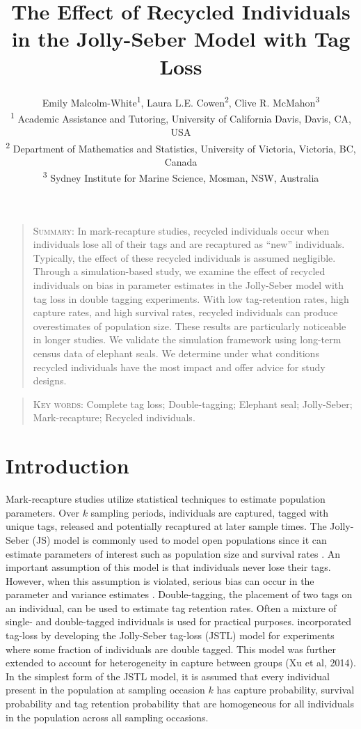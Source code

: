 \documentclass[]{article}
\title{The Effect of Recycled Individuals in the Jolly-Seber Model with Tag
Loss}
\author{Emily Malcolm-White\textsuperscript{1},
        Laura L.E. Cowen\textsuperscript{2}, 
        Clive R. McMahon\textsuperscript{3}\\ 
        \textsuperscript{1} Academic Assistance and Tutoring, University of California Davis, Davis, CA, USA\\ 
        \textsuperscript{2} Department of Mathematics and Statistics, University of Victoria, Victoria, BC, Canada\\
        \textsuperscript{3} Sydney Institute for Marine Science, Mosman, NSW, Australia}
\begin{document}
\maketitle


\begin{quote}
\textsc{Summary:} In mark-recapture studies, recycled individuals occur
when individuals lose all of their tags and are recaptured as ``new''
individuals. Typically, the effect of these recycled individuals is
assumed negligible. Through a simulation-based study, we examine the
effect of recycled individuals on bias in parameter estimates in the
Jolly-Seber model with tag loss \citep{Cowen:2006} in double tagging experiments. With low tag-retention
rates, high capture rates, and high survival rates, recycled individuals
can produce overestimates of population size. These results are
particularly noticeable in longer studies. We validate the simulation
framework using long-term census data of elephant seals. We
determine under what conditions recycled individuals have the most
impact and offer advice for study designs.
\end{quote}

\begin{quote}
\begin{center} \textsc{Key words:} Complete tag loss; Double-tagging; Elephant seal; Jolly-Seber; Mark-recapture;   Recycled individuals. 
\end{center}
\end{quote}

\section{Introduction}\label{introduction}

Mark-recapture studies utilize statistical techniques to estimate
population parameters. Over \(k\) sampling
periods, individuals are captured, tagged with unique tags, released and potentially
recaptured at later sample times. The Jolly-Seber (JS) model \citep{Jolly:1965, Seber:1965}
 is commonly used to model open populations since it
can estimate parameters of interest such as population size and survival
rates \citep{Pollock:1990}. An important assumption of this model is that 
individuals never lose their tags. However, when this assumption is
violated, serious bias can occur in the parameter and variance estimates
\citep{Arnason:1981}. Double-tagging, the placement of two tags on
an individual, can be used to estimate tag retention rates. Often a
mixture of single- and double-tagged individuals is used for practical
purposes. \cite{Cowen:2006} incorporated tag-loss by developing
the Jolly-Seber tag-loss (JSTL) model for experiments where some
fraction of individuals are double tagged. This model was further
extended to account for heterogeneity in capture between groups (Xu et
al, 2014). In the simplest form of the JSTL model, it is assumed that
every individual present in the population at sampling occasion \(k\)
has capture probability, survival probability and tag retention
probability that are homogeneous for all individuals in the population
across all sampling occasions.
\end{document}
